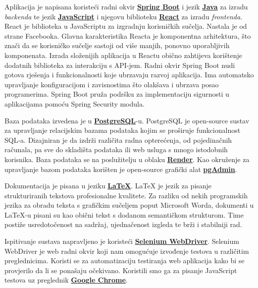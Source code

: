 			 Aplikacija je napisana koristeći radni okvir \textbf{\href{https://spring.io/projects/spring-boot}{Spring Boot}} i jezik 
			 \textbf{\href{https://www.java.com/en/}{Java}} za izradu \textit{backenda} te jezik \textbf{\href{https://www.javascript.com/}{JavaScript}} 
			 i njegovu biblioteku \textbf{\href{https://react.dev/}{React}} za izradu \textit{frontenda}. React je biblioteka 
			 u JavaScriptu za izgradnju korisničkih sučelja. Nastala je od strane Facebooka. Glavna karakteristika Reacta je komponentna 
			 arhitektura, što znači da se korisničko sučelje sastoji od više manjih, ponovno uporabljivih komponenata. Izrada 
			 složenijih aplikacija u Reactu obično zahtijeva korištenje dodatnih biblioteka za interakciju s API-jem. Radni okvir 
			 Spring Boot nudi gotova rješenja i funkcionalnosti koje ubrzavaju razvoj aplikacija. Ima automatsko upravljanje 
			 konfiguracijom i zavisnostima što olakšava i ubrzava posao programerima. Spring Boot pruža podršku za implementaciju 
			 sigurnosti u aplikacijama pomoću Spring Security modula. 

			 Baza podataka izvedena je u \textbf{\href{https://www.postgresql.org/}{PostgreSQL}}-u. PostgreSQL je open-source sustav za upravljanje relacijskim bazama
			 podataka kojim se proširuje funkcionalnost SQL-a. Dizajniran je da izdrži različita radna opterećenja, od 
			 pojedinačnih računala, pa sve do skladišta podataka ili web usluga s mnogo istodobnih korisnika. Baza podataka
			 se na poslužitelju u oblaku \textbf{\href{https://render.com/}{Render}}. Kao okruženje za upravljanje bazom
			 podataka korišten je open-source grafički alat \textbf{\href{https://www.pgadmin.org/}{pgAdmin}}.

		     Dokumentacija je pisana u jeziku \textbf{\href{https://www.latex-project.org/}{LaTeX}}. LaTeX je jezik za pisanje
			 strukturiranih tekstova profesionalne kvalitete. Za razliku od nekih programskih jezika za obradu teksta s grafičkim
			 sučeljem poput Microsoft Worda, dokumenti u LaTeX-u pisani su kao obični tekst s dodanom semantičkom strukturom. Time 
			 postiže usredotočenost na sadržaj, ujednačenost izgleda te brži i stabilniji rad.

			 Ispitivanje sustava napravljeno je koristeći \textbf{\href{https://www.selenium.dev/documentation/webdriver/}{Selenium WebDriver}}.
			 Selenium WebDriver je web radni okvir koji nam omogućuje izvođenje testova u različitim preglednicima.
			 Koristi se za automatizaciju testiranja web aplikacija kako bi se provjerilo da li se ponašaju očekivano. Koristili smo
			 ga za pisanje JavaScript testova uz preglednik \textbf{\href{https://www.google.com/chrome/}{Google Chrome}}.

